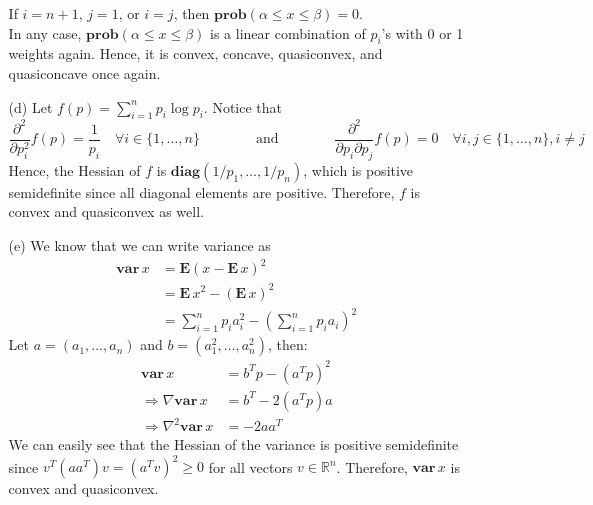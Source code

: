 \documentclass{article}
\begin{document}
\begin{itemize}
\begin{itemize}
    If $i = n + 1$, $j = 1$, or $i = j$, then $\mathbf{prob}(\alpha \le x \le \beta) = 0$. \\
    In any case, $\mathbf{prob}(\alpha \le x \le \beta)$ is a linear combination of $p_i$'s with 0 or 1 weights again. Hence, it is convex, concave, quasiconvex, and quasiconcave once again.
    \item[(d)] Let $f(p) = \sum_{i=1}^n p_i \log p_i$. Notice that
    \[ \frac{\partial^2}{\partial p_i^2} f(p) = \frac{1}{p_i} \quad \forall i \in \{1, \dots, n\}
    \qquad \qquad \text{and} \qquad \qquad
    \frac{\partial^2}{\partial p_i \partial p_j} f(p) = 0 \quad \forall i, j \in \{1, \dots, n\}, i \ne j \]
    Hence, the Hessian of $f$ is $\mathbf{diag}(1/p_1, \dots, 1/p_n)$, which is positive semidefinite since all diagonal elements are positive. Therefore, $f$ is convex and quasiconvex as well.
    \item[(e)] We know that we can write variance as
    \begin{align*}
      \mathbf{var}\,x &= \mathbf{E}(x - \mathbf{E}\,x)^2 \\
      &= \mathbf{E}\,x^2 - (\mathbf{E}\,x)^2 \\
      &= \sum_{i=1}^n p_i a_i^2 - \left(\sum_{i=1}^n p_i a_i\right)^2
    \end{align*}
    Let $a = (a_1, \dots, a_n)$ and $b = (a_1^2, \dots, a_n^2)$, then:
    \begin{align*}
      \mathbf{var}\,x &= b^T p - (a^T p)^2 \\
      \Rightarrow \nabla \mathbf{var}\,x &= b^T - 2(a^T p)a \\
      \Rightarrow \nabla^2 \mathbf{var}\,x &= -2 a a^T
    \end{align*}
    We can easily see that the Hessian of the variance is positive semidefinite since $v^T(aa^T)v = (a^Tv)^2 \ge 0$ for all vectors $v \in \mathbb{R}^n$. Therefore, $\mathbf{var}\,x$ is convex and quasiconvex.
  \end{itemize}


\end{itemize}
\end{document}
